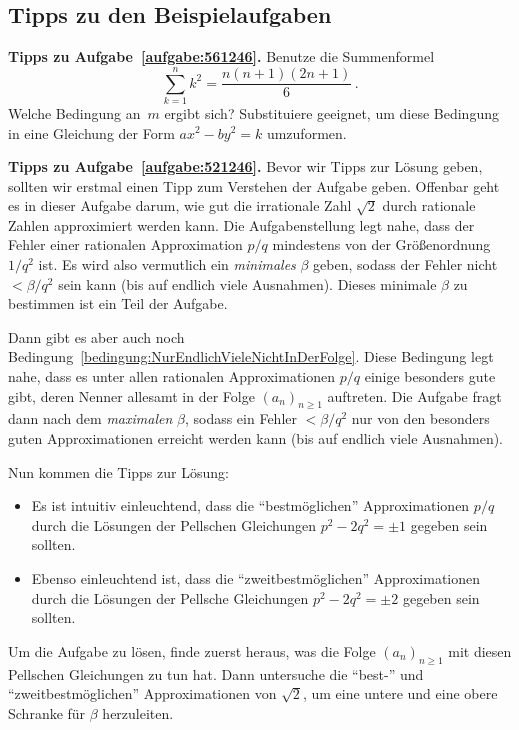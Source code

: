 \subsection*{Tipps zu den Beispielaufgaben}

\textbf{Tipps zu Aufgabe~\ref{aufgabe:561246}.} Benutze die Summenformel
\begin{equation*}
	\sum_{k=1}^nk^2=\frac{n(n+1)(2n+1)}{6}\,.
\end{equation*}
Welche Bedingung an~$m$ ergibt sich? Substituiere geeignet, um diese Bedingung in eine Gleichung der Form $ax^2-by^2=k$ umzuformen.

\textbf{Tipps zu Aufgabe~\ref{aufgabe:521246}.} Bevor wir Tipps zur Lösung geben, sollten wir erstmal einen Tipp zum Verstehen der Aufgabe geben. Offenbar geht es in dieser Aufgabe darum, wie gut die irrationale Zahl $\sqrt{2}$ durch rationale Zahlen approximiert werden kann. Die Aufgabenstellung legt nahe, dass der Fehler einer rationalen Approximation $p/q$ mindestens von der Größenordnung $1/q^2$ ist. Es wird also vermutlich ein \emph{minimales} $\beta$ geben, sodass der Fehler nicht $<\beta/q^2$ sein kann (bis auf endlich viele Ausnahmen). Dieses minimale $\beta$ zu bestimmen ist ein Teil der Aufgabe.

Dann gibt es aber auch noch Bedingung~\ref{bedingung:NurEndlichVieleNichtInDerFolge}. Diese Bedingung legt nahe, dass es unter allen rationalen Approximationen $p/q$ einige besonders gute gibt, deren Nenner allesamt in der Folge $(a_n)_{n\geqslant1}$ auftreten. Die Aufgabe fragt dann nach dem \emph{maximalen} $\beta$, sodass ein Fehler $<\beta/q^2$ nur von den besonders guten Approximationen erreicht werden kann (bis auf endlich viele Ausnahmen).

Nun kommen die Tipps zur Lösung:
\begin{itemize}
	\item Es ist intuitiv einleuchtend, dass die \enquote{bestmöglichen} Approximationen $p/q$ durch die Lösungen der Pellschen Gleichungen $p^2-2q^2 =\pm1$ gegeben sein sollten.
	\item Ebenso einleuchtend ist, dass die \enquote{zweitbestmöglichen} Approximationen durch die Lösungen der Pellsche Gleichungen $p^2-2q^2=\pm2$ gegeben sein sollten.
\end{itemize}
Um die Aufgabe zu lösen, finde zuerst heraus, was die Folge $(a_n)_{n\geqslant 1}$ mit diesen Pellschen Gleichungen zu tun hat. Dann untersuche die \enquote{best-} und \enquote{zweitbestmöglichen} Approximationen von $\sqrt{2}$, um eine untere und eine obere Schranke für $\beta$ herzuleiten.
